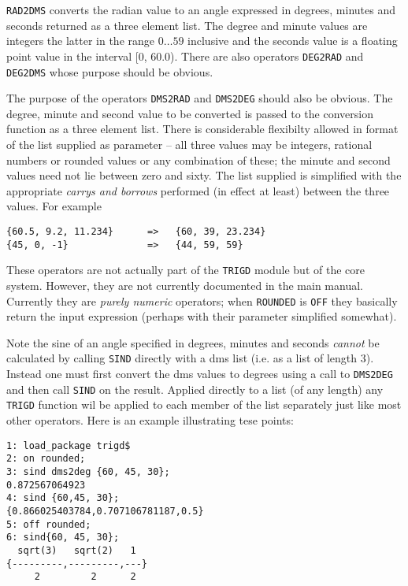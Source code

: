 \texttt{RAD2DMS} converts the radian value to an angle expressed in degrees, minutes and seconds returned as a three element list.  The degree and minute values are integers the latter in the range $0 \ldots 59$ inclusive and the seconds value is  a floating point value in the interval [0, 60.0).
There are also operators \texttt{DEG2RAD} and \texttt{DEG2DMS} whose purpose should be obvious.

The purpose of the operators  \texttt{DMS2RAD} and \texttt{DMS2DEG} should  also be obvious.  The degree, minute and second value to be converted is passed to the conversion function as a three element list.  There is considerable flexibilty allowed in  format of the list supplied as parameter -- all three values may be integers, rational numbers or rounded values or any combination of these; the minute and second values need not lie between zero and sixty.  The list supplied is simplified with the appropriate {\it carrys and borrows} performed (in effect at least) between the three values.  For example
\begin{verbatim} 
{60.5, 9.2, 11.234}      =>   {60, 39, 23.234}
{45, 0, -1}              =>   {44, 59, 59}
\end{verbatim}

These operators are not actually part of the \texttt{TRIGD} module but of the {\REDUCE} core system. However, they are not currently documented in the main manual.  Currently they are \emph{purely numeric} operators; when \texttt{ROUNDED} is \texttt{OFF} they basically return the input expression (perhaps with their parameter simplified somewhat).  

Note the sine of an angle specified in degrees, minutes and seconds \emph{cannot} be calculated by calling \texttt{SIND} directly with a dms list (i.e. as a list of length 3).  Instead one must first convert the dms values to degrees using a call to \texttt{DMS2DEG} and then call \texttt{SIND} on the result.  Applied directly to a list (of any length) any \texttt{TRIGD} function wil be applied to each member of the list separately just like most other {\REDUCE} operators. Here is an example illustrating tese points:
\begin{verbatim}
1: load_package trigd$
2: on rounded;
3: sind dms2deg {60, 45, 30};
0.872567064923
4: sind {60,45, 30};
{0.866025403784,0.707106781187,0.5}
5: off rounded;
6: sind{60, 45, 30};
  sqrt(3)   sqrt(2)   1
{---------,---------,---}
     2         2      2
\end{verbatim}
 
